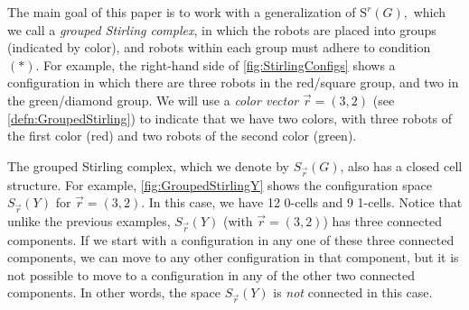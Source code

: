 \documentclass{amsart}
\newcommand{\Sr}{S_{\vec{r}}}
\newcommand{\St}{\mathrm{S}}
\theoremstyle{definition}
\theoremstyle{remark}
\begin{document}
The main goal of this paper is to work with a generalization of $\St^r(G),$ which we call a \textit{grouped Stirling complex}, in which the robots are placed into groups (indicated by color), and robots within each group must adhere to condition $(\ast)$. For example, the right-hand side of \cref{fig:StirlingConfigs} shows a configuration in which there are three robots in the red/square group, and two in the green/diamond group. We will use a \textit{color vector} $\vec{r}=(3,2)$ (see \cref{defn:GroupedStirling}) to indicate that we have two colors, with three robots of the first color (red) and two robots of the second color (green).

The grouped Stirling complex, which we denote by $\Sr(G)$, also has a closed cell structure. For example, \cref{fig:GroupedStirlingY} shows the configuration space $\Sr(Y)$ for $\vec{r}=(3,2).$ In this case, we have 12 0-cells and 9 1-cells. Notice that unlike the previous examples, $\Sr(Y)$ (with $\vec{r}=(3,2)$) has three connected components. If we start with a configuration in any one of these three connected components, we can move to any other configuration in that component, but it is not possible to move to a configuration in any of the other two connected components. In other words, the space $\Sr(Y)$ is \textit{not} connected in this case. 
\end{document}
